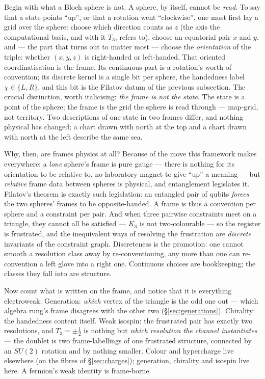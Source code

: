 Begin with what a Bloch sphere is not. A sphere, by itself, cannot be \emph{read}. To say that a
state points ``up'', or that a rotation went ``clockwise'', one must first lay a grid over the
sphere: choose which direction counts as $z$ (the axis the computational basis, and with it $T_3$,
refers to), choose an equatorial pair $x$ and $y$, and --- the part that turns out to matter most
--- choose the \emph{orientation} of the triple: whether $(x, y, z)$ is right-handed or
left-handed. That oriented coordinatisation is the frame. Its continuous part is a rotation's worth
of convention; its discrete kernel is a single bit per sphere, the handedness label
$\chi \in \{L, R\}$, and this bit is the Filatov datum of the previous subsection. The crucial
distinction, worth italicising: \emph{the frame is not the state}. The state is a point of the
sphere; the frame is the grid the sphere is read through --- map-grid, not territory. Two
descriptions of one state in two frames differ, and nothing physical has changed; a chart drawn
with north at the top and a chart drawn with north at the left describe the same sea.

Why, then, are frames physics at all? Because of the move this framework makes everywhere: a
\emph{lone} sphere's frame is pure gauge --- there is nothing for its orientation to be relative
to, no laboratory magnet to give ``up'' a meaning --- but \emph{relative} frame data between
spheres is physical, and entanglement legislates it. Filatov's theorem
\autocite{filatov2024towards} is exactly such legislation: an entangled pair of qubits
\emph{forces} the two spheres' frames to be opposite-handed. A frame is thus a convention per
sphere and a constraint per pair. And when three pairwise constraints meet on a triangle, they
cannot all be satisfied --- $K_3$ is not two-colourable --- so the register is frustrated, and the
inequivalent ways of resolving the frustration are \emph{discrete} invariants of the constraint
graph. Discreteness is the promotion: one cannot smooth a resolution class away by
re-conventioning, any more than one can re-convention a left glove into a right one. Continuous
choices are bookkeeping; the classes they fall into are structure.

Now count what is written on the frame, and notice that it is everything electroweak. Generation:
\emph{which} vertex of the triangle is the odd one out --- which algebra rung's frame disagrees
with the other two (\S\ref{sec:generations}). Chirality: the handedness content itself. Weak
isospin: the frustrated pair has exactly two resolutions, and $T_3 = \pm\tfrac12$ is nothing but
\emph{which resolution the channel instantiates} --- the doublet is two frame-labellings of one
frustrated structure, connected by an $SU(2)$ rotation and by nothing smaller. Colour and
hypercharge live elsewhere (on the fibres of \S\ref{sec:charges}); generation, chirality and
isospin live here. A fermion's weak identity is frame-borne.

